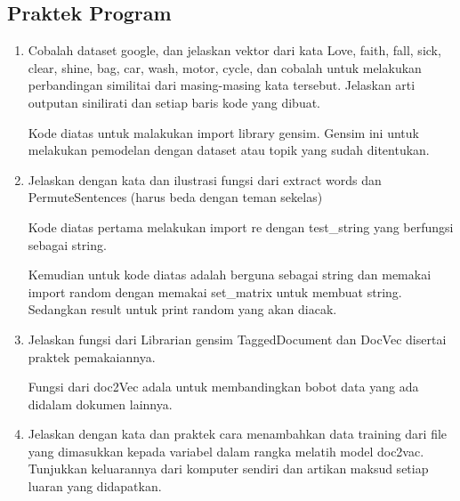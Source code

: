 \subsection{Praktek Program}
\begin{enumerate}

\item Cobalah dataset google, dan jelaskan vektor dari kata Love, faith, fall, sick, clear, shine, bag, car, wash, motor, cycle, dan cobalah untuk melakukan perbandingan  similitai dari masing-masing kata tersebut. Jelaskan arti outputan sinilirati dan setiap baris kode yang dibuat.

	\hfill\break
	

Kode diatas untuk malakukan import library gensim. Gensim ini untuk melakukan pemodelan dengan dataset atau topik yang sudah ditentukan.

	\hfill\break
	

\item Jelaskan dengan kata dan ilustrasi fungsi dari extract words dan PermuteSentences (harus beda dengan teman sekelas)

	\hfill\break
	

Kode diatas pertama melakukan import re dengan test\_string yang berfungsi sebagai string.

Kemudian untuk kode diatas adalah berguna sebagai string dan memakai import random dengan memakai set\_matrix untuk membuat string. Sedangkan  result untuk print random yang akan diacak. 

	\hfill\break
	

\item Jelaskan fungsi dari Librarian gensim TaggedDocument dan DocVec disertai praktek pemakaiannya. 

	\hfill\break
	
	
Fungsi dari doc2Vec adala untuk membandingkan  bobot data yang ada didalam dokumen lainnya.

\item Jelaskan dengan kata dan praktek cara menambahkan data training dari file
yang dimasukkan kepada variabel dalam rangka melatih model doc2vac. Tunjukkan keluarannya dari komputer sendiri dan artikan maksud setiap luaran
yang didapatkan.
	

\end{enumerate}
